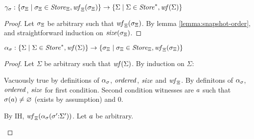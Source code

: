 \documentclass{llncs}
\begin{document}
\begin{lemma}[Wellformedness (a)]
$\gamma_\sigma : \{\sigma_{\Xi} \mid \sigma_{\Xi} \in \mathit{Store}_{\Xi}, \mathit{wf}_{\Xi}(\sigma_{\Xi})\} \to 
               \{\Sigma \mid \Sigma \in \mathit{Store}^*, \mathit{wf}(\Sigma)\}$
\end{lemma}
\begin{proof}
Let $\sigma_{\Xi}$ be arbitrary such that $\mathit{wf}_{\Xi}(\sigma_{\Xi})$.
By lemma \ref{lemma:snapshot-order}, and straightforward induction on $\mathit{size}(\sigma_{\Xi})$.
\end{proof}

\begin{lemma}[Wellformedness (b)]
$\alpha_\sigma : \{\Sigma \mid \Sigma \in \mathit{Store}^*, \mathit{wf}(\Sigma)\} \to 
               \{\sigma_{\Xi} \mid \sigma_{\Xi} \in \mathit{Store}_{\Xi}, \mathit{wf}_{\Xi}(\sigma_{\Xi})\}$
\end{lemma}
\begin{proof}
Let $\Sigma$ be arbitrary such that $\mathit{wf}(\Sigma)$.
By induction on $\Sigma$:
\begin{byCases}
   {Vacuously true by definitions of $\alpha_\sigma$, $\mathit{ordered}$, $\mathit{size}$ and $\mathit{wf}_{\Xi}$.}
   {By definitons of $\alpha_\sigma$, $\mathit{ordered}$, $\mathit{size}$ for first condition.
    Second condition witnesses are $a$ such that
     $\sigma(a) \neq \varnothing$ (exists by assumption) and 0.}
  {By IH, $\mathit{wf}_{\Xi}(\alpha_\sigma(\sigma' {\tt :} \Sigma'))$.
   Let $a$ be arbitrary.
   \begin{byCases}
   \end{byCases}}
\end{byCases}
\end{proof}
\end{document}
